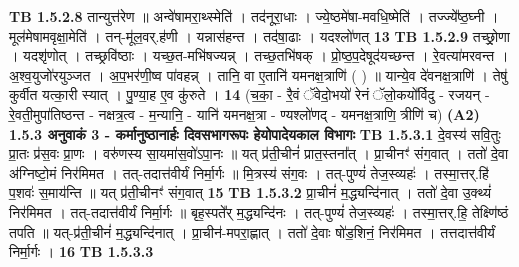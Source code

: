 \documentclass[17pt]{extarticle}
\begin{document}
                                \textbf{ TB 1.5.2.8} \newline
                  तान्युत्त॑रेण ॥ अन्वे॑षामरा॒थ्स्मेति॑ । तद॑नूरा॒धाः । ज्ये॒ष्ठमे॑षा-मवधि॒ष्मेति॑ । तज्ज्ये᳚ष्ठ॒घ्नी । मूल॑मेषामवृक्षा॒मेति॑ । तन्-मू॑ल॒वर्.ह॑णी । यन्नास॑हन्त । तद॑षा॒ढाः । यदश्लो॑णत् \textbf{ 13} \newline
                  \newline
                                \textbf{ TB 1.5.2.9} \newline
                  तच्छ्रो॒णा । यदशृ॑णोत् । तच्छ्रवि॑ष्ठाः । यच्छ॒त-मभि॑षज्यन्न् । तच्छ॒तभि॑षक् । प्रो॒ष्ठ॒प॒देषूद॑यच्छन्त । रे॒वत्या॑मरवन्त । अ॒श्व॒युजो॑रयुञ्जत । अ॒प॒भर॑णी॒ष्व पा॑वहन्न् । तानि॒ वा ए॒तानि॑ यमनक्ष॒त्राणि॑ ( ) ॥ यान्ये॒व दे॑वनक्ष॒त्राणि॑ । तेषु॑ कुर्वीत यत्का॒री स्यात् । पु॒ण्या॒ह ए॒व कु॑रुते । \textbf{ 14} \newline
                  \newline
                                    (च॒का॒ - रै॒वं ॅवेदो॒भयो॑ रेनं ॅलो॒कयो᳚र्विदु - रजयन् - रे॒वती॒मुपा॑तिष्ठन्त - नक्षत्र॒त्व - म॒न्यानि॒ - यानि॑ यमनक्ष॒त्रा - ण्यश्लो॑णद् - यमनक्ष॒त्राणि॒ त्रीणि॑ च) \textbf{(A2)} \newline \newline
                \textbf{ 1.5.3     अनुवाकं   3 - कर्मानुष्ठानार्हः दिवसभागरूपः हेयोपादेयकाल विभागः} \newline
                                \textbf{ TB 1.5.3.1} \newline
                  दे॒वस्य॑ सवि॒तुः प्रा॒तः प्र॑स॒वः प्रा॒णः । वरु॑णस्य सा॒यमा॑स॒वो॑ऽपा॒नः ॥ यत् प्र॑ती॒चीनं॑ प्रात॒स्तना᳚त् । प्रा॒चीनꣳ॑ संग॒वात् । ततो॑ दे॒वा अ॑ग्निष्टो॒मं निर॑मिमत । तत्-तदात्त॑वीर्यं निर्मा॒र्गः ॥ मि॒त्रस्य॑ संग॒वः । तत्-पुण्यं॑ तेज॒स्व्यहः॑ । तस्मा॒त्तर्.हि॑ प॒शवः॑ स॒माय॑न्ति ॥ यत् प्र॑ती॒चीनꣳ॑ संग॒वात् \textbf{ 15} \newline
                  \newline
                                \textbf{ TB 1.5.3.2} \newline
                  प्रा॒चीनं॑ म॒द्ध्यन्दि॑नात् । ततो॑ दे॒वा उ॒क्थ्यं॑ निर॑मिमत । तत्-तदात्त॑वीर्यं निर्मा॒र्गः ॥ बृह॒स्पते᳚र् म॒द्ध्यन्दि॑नः । तत्-पुण्यं॑ तेज॒स्व्यहः॑ । तस्मा॒त्तर्.हि॒ तेक्ष्णि॑ष्ठं तपति ॥ यत्-प्र॑ती॒चीनं॑ म॒द्ध्यन्दि॑नात् । प्रा॒चीन॑-मपरा॒ह्णात् । ततो॑ दे॒वाः षो॑ड॒शिनं॒ निर॑मिमत । तत्तदात्त॑वीर्यं निर्मा॒र्गः । \textbf{ 16} \newline
                  \newline
                                \textbf{ TB 1.5.3.3} \newline
\end{document}
